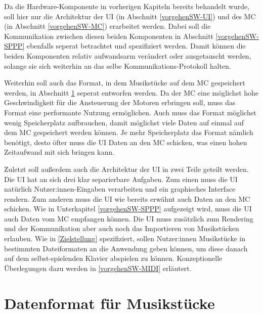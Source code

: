 Da die Hardware-Komponente in vorherigen Kapiteln bereits behandelt wurde, soll hier nur die Architektur der \ac{UI} (in Abschnitt \ref{vorgehenSW-UI}) und des \ac{MC} (in Abschnitt \ref{vorgehenSW-MC}) erarbeitet werden.
Dabei soll die Kommunikation zwischen diesen beiden Komponenten in Abschnitt \ref{vorgehenSW-SPPP} ebenfalls seperat betrachtet und spezifiziert werden.
Damit können die beiden Komponenten relativ aufwandsarm verändert oder ausgetauscht werden, solange sie sich weiterhin an das selbe Kommunikations-Protokoll halten.

Weiterhin soll auch das Format, in dem Musikstücke auf dem \ac{MC} gespeichert werden, in Abschnitt \ref{vorgehenSW-PIDI} seperat entworfen werden.
Da der \ac{MC} eine möglichst hohe Geschwindigkeit für die Ansteuerung der Motoren erbringen soll, muss das Format eine performante Nutzung ermöglichen.
Auch muss das Format möglichst wenig Speicherplatz aufbrauchen, damit möglichst viele Daten auf einmal auf dem \ac{MC} gespeichert werden können.
Je mehr Speicherplatz das Format nämlich benötigt, desto öfter muss die \ac{UI} Daten an den \ac{MC} schicken, was einen hohen Zeitaufwand mit sich bringen kann.

Zuletzt soll außerdem auch die Architektur der \ac{UI} in zwei Teile geteilt werden.
Die \ac{UI} hat an sich drei klar separierbare Aufgaben.
Zum einen muss die \ac{UI} natürlich Nutzer:innen-Eingaben verarbeiten und ein graphisches Interface rendern.
Zum anderen muss die \ac{UI} wie bereits erwähnt auch Daten an den \ac{MC} schicken.
Wie in Unterkapitel \ref{vorgehenSW-SPPP} aufgezeigt wird, muss die \ac{UI} auch Daten vom \ac{MC} empfangen können.
Die UI muss zusätzlich zum Rendering und der Kommunikation aber auch noch das Importieren von Musikstücken erlauben.
Wie in \ref{Zielstellung} spezifiziert, sollen Nutzer:innen Musikstücke in bestimmten Dateiformaten an die Anwendung geben können, um diese danach auf dem selbst-spielenden Klavier abspielen zu können.
Konzeptionelle Überlegungen dazu werden in \ref{vorgehenSW-MIDI} erläutert.


\section{Datenformat für Musikstücke} \label{vorgehenSW-PIDI}

